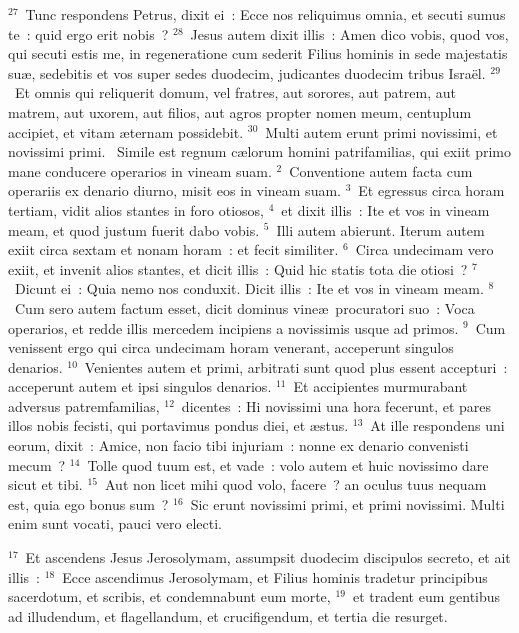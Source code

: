 ${}^{27}$~Tunc respondens Petrus, dixit ei~: Ecce nos reliquimus omnia, et secuti sumus te~: quid ergo erit nobis~?
${}^{28}$~Jesus autem dixit illis~: Amen dico vobis, quod vos, qui secuti estis me, in regeneratione cum sederit Filius hominis in sede majestatis su\ae , sedebitis et vos super sedes duodecim, judicantes duodecim tribus Isra\"el.
${}^{29}$~Et omnis qui reliquerit domum, vel fratres, aut sorores, aut patrem, aut matrem, aut uxorem, aut filios, aut agros propter nomen meum, centuplum accipiet, et vitam \ae ternam possidebit.
${}^{30}$~Multi autem erunt primi novissimi, et novissimi primi.
~Simile est regnum c\ae lorum homini patrifamilias, qui exiit primo mane conducere operarios in vineam suam.
${}^{2}$~Conventione autem facta cum operariis ex denario diurno, misit eos in vineam suam.
${}^{3}$~Et egressus circa horam tertiam, vidit alios stantes in foro otiosos,
${}^{4}$~et dixit illis~: Ite et vos in vineam meam, et quod justum fuerit dabo vobis.
${}^{5}$~Illi autem abierunt. Iterum autem exiit circa sextam et nonam horam~: et fecit similiter.
${}^{6}$~Circa undecimam vero exiit, et invenit alios stantes, et dicit illis~: Quid hic statis tota die otiosi~?
${}^{7}$~Dicunt ei~: Quia nemo nos conduxit. Dicit illis~: Ite et vos in vineam meam.
${}^{8}$~Cum sero autem factum esset, dicit dominus vine\ae\ procuratori suo~: Voca operarios, et redde illis mercedem incipiens a novissimis usque ad primos.
${}^{9}$~Cum venissent ergo qui circa undecimam horam venerant, acceperunt singulos denarios.
${}^{10}$~Venientes autem et primi, arbitrati sunt quod plus essent accepturi~: acceperunt autem et ipsi singulos denarios.
${}^{11}$~Et accipientes murmurabant adversus patremfamilias,
${}^{12}$~dicentes~: Hi novissimi una hora fecerunt, et pares illos nobis fecisti, qui portavimus pondus diei, et \ae stus.
${}^{13}$~At ille respondens uni eorum, dixit~: Amice, non facio tibi injuriam~: nonne ex denario convenisti mecum~?
${}^{14}$~Tolle quod tuum est, et vade~: volo autem et huic novissimo dare sicut et tibi.
${}^{15}$~Aut non licet mihi quod volo, facere~? an oculus tuus nequam est, quia ego bonus sum~?
${}^{16}$~Sic erunt novissimi primi, et primi novissimi. Multi enim sunt vocati, pauci vero electi.


${}^{17}$~Et ascendens Jesus Jerosolymam, assumpsit duodecim discipulos secreto, et ait illis~:
${}^{18}$~Ecce ascendimus Jerosolymam, et Filius hominis tradetur principibus sacerdotum, et scribis, et condemnabunt eum morte,
${}^{19}$~et tradent eum gentibus ad illudendum, et flagellandum, et crucifigendum, et tertia die resurget.


